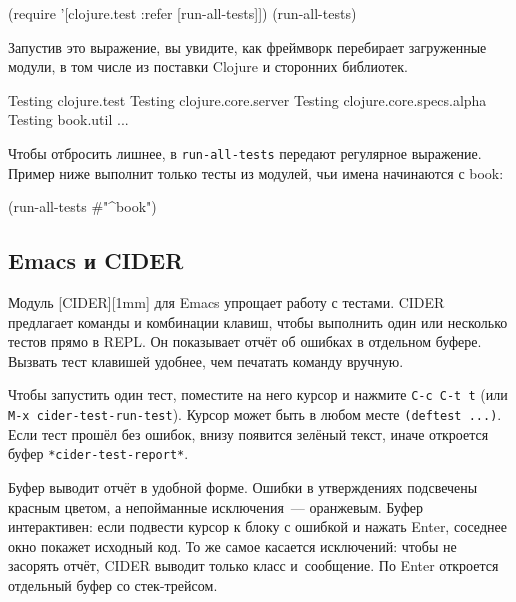 \begin{english}
  \begin{clojure}
(require '[clojure.test :refer [run-all-tests]])
(run-all-tests)
  \end{clojure}
\end{english}

\fi

Запустив это выражение, вы увидите, как фреймворк перебирает загруженные модули,
в том числе из поставки Clojure и сторонних библиотек.

\begin{english}
  \begin{text}
Testing clojure.test
Testing clojure.core.server
Testing clojure.core.specs.alpha
Testing book.util
...
  \end{text}
\end{english}


Чтобы отбросить лишнее, в \verb|run-all-tests| передают регулярное выражение.
Пример ниже выполнит только тесты из модулей, чьи имена начинаются с book:

\begin{english}
  \begin{clojure}
(run-all-tests #"^book")
  \end{clojure}
\end{english}

\subsection{Emacs и CIDER}


Модуль [CIDER][1mm] для
Emacs упрощает работу с тестами. CIDER предлагает команды и комбинации клавиш,
чтобы выполнить один или несколько тестов прямо в REPL. Он показывает отчёт об
ошибках в отдельном буфере. Вызвать тест клавишей удобнее, чем печатать команду
вручную.

Чтобы запустить один тест, поместите на него курсор и нажмите \verb|C-c C-t t|
(или \verb|M-x cider-test-run-test|). Курсор может быть в любом месте
\verb|(deftest ...)|. Если тест прошёл без ошибок, внизу появится зелёный
текст, иначе откроется буфер \verb|*cider-test-report*|.

Буфер выводит отчёт в удобной форме. Ошибки в утверждениях подсвечены красным
цветом, а непойманные исключения~--- оранжевым. Буфер интерактивен: если
подвести курсор к блоку с ошибкой и нажать Enter, соседнее окно покажет исходный
код. То же самое касается исключений: чтобы не засорять отчёт, CIDER выводит
только класс и~сообщение. По Enter откроется отдельный буфер со стек-трейсом.

